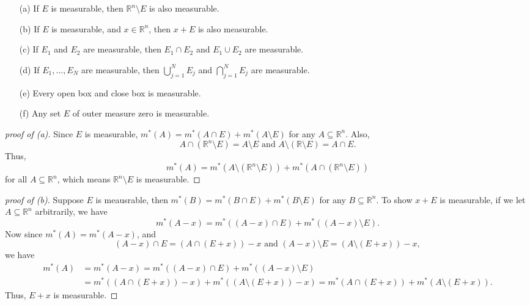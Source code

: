 \begin{lemma}
\hfill
    \begin{itemize}
        \item [(a)] If \(E\) is measurable, then \(\mathbb{R} ^n \setminus E\) is also measurable. 
        \item [(b)] If \(E\) is measurable, and \(x \in \mathbb{R} ^n\), then \(x + E\) is also measurable. 
        \item [(c)] If \(E_1\) and \(E_2\) are measurable, then \(E_1 \cap E_2\) and \(E_1 \cup E_2\) are measurable. 
        \item [(d)] If \(E_1, \dots , E_N\) are measurable, then \(\bigcup_{j=1}^{N} E_j \) and \(\bigcap_{j=1}^{N} E_j \) are measurable. 
        \item [(e)] Every open box and close box is measurable. 
        \item [(f)] Any set \(E\) of outer measure zero is measurable.           
    \end{itemize}
\end{lemma}

\begin{proof}[proof of (a)]
    Since \(E\) is measurable, \(m^*(A) = m^*(A \cap E) + m^*(A \setminus E)\) for any \(A \subseteq \mathbb{R} ^n\). Also,
    \[
        A \cap (\mathbb{R} ^n \setminus E) = A \setminus E \text{ and } A \setminus (\mathbb{R} \setminus E) = A \cap E. 
    \]   
    Thus,
    \[
        m^*(A) = m^*(A \setminus (\mathbb{R} ^n \setminus E)) + m^*(A \cap (\mathbb{R} ^n \setminus E))
    \]
    for all \(A \subseteq \mathbb{R} ^n\), which means \(\mathbb{R} ^n \setminus E\) is measurable.  
\end{proof}

\begin{proof}[proof of (b)]
    Suppose \(E\) is meausrable, then \(m^*(B) = m^*(B \cap E) + m^*(B \setminus E)\) for any \(B \subseteq \mathbb{R} ^n\). To show \(x + E\) is measurable, if we let \(A \subseteq \mathbb{R} ^n\) arbitrarily, we have 
    \[
        m^*(A - x) = m^*((A - x) \cap E) + m^*((A - x) \setminus E).
    \] 
    Now since \(m^*(A) = m^*(A - x)\), and
    \[
        (A - x) \cap E = (A \cap (E + x)) - x \text{ and } (A - x) \setminus E = (A \setminus (E + x)) - x, 
    \]      
    we have 
    \begin{align*}
        m^*(A) &= m^*(A - x) = m^*((A - x) \cap E) + m^*((A - x) \setminus E) \\
        &= m^*((A \cap (E + x)) - x) + m^*((A \setminus (E + x)) - x) = m^*(A \cap  (E + x)) + m^*(A \setminus (E + x)). 
    \end{align*}
    Thus, \(E + x\) is measurable. 
\end{proof}


